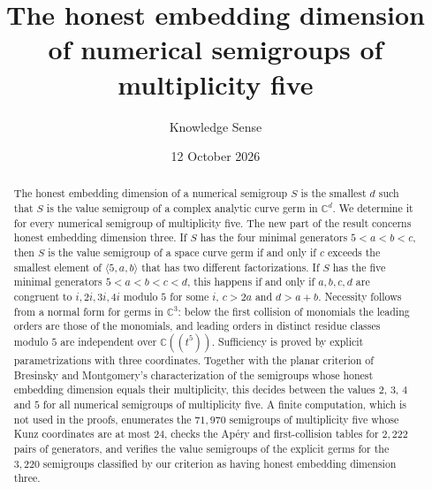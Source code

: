 \documentclass{amsart}
\theoremstyle{definition}
\theoremstyle{remark}
\numberwithin{equation}{section}
\newcommand{\C}{\mathbb{C}}
\newcommand{\gen}[1]{\langle #1\rangle}
\begin{document}
\title[Honest embedding dimension in multiplicity five]{The honest embedding dimension of numerical semigroups of multiplicity five}

\author{Knowledge Sense}

\date{12 October 2026}



\begin{abstract}
The honest embedding dimension of a numerical semigroup $S$ is the smallest $d$ such that $S$ is the value semigroup of a complex analytic curve germ in $\C^d$. We determine it for every numerical semigroup of multiplicity five. The new part of the result concerns honest embedding dimension three. If $S$ has the four minimal generators $5<a<b<c$, then $S$ is the value semigroup of a space curve germ if and only if $c$ exceeds the smallest element of $\gen{5,a,b}$ that has two different factorizations. If $S$ has the five minimal generators $5<a<b<c<d$, this happens if and only if $a,b,c,d$ are congruent to $i,2i,3i,4i$ modulo $5$ for some $i$, $c>2a$ and $d>a+b$. Necessity follows from a normal form for germs in $\C^3$: below the first collision of monomials the leading orders are those of the monomials, and leading orders in distinct residue classes modulo $5$ are independent over $\C((t^5))$. Sufficiency is proved by explicit parametrizations with three coordinates. Together with the planar criterion of Bresinsky and Montgomery's characterization of the semigroups whose honest embedding dimension equals their multiplicity, this decides between the values $2$, $3$, $4$ and $5$ for all numerical semigroups of multiplicity five. A finite computation, which is not used in the proofs, enumerates the $71{,}970$ semigroups of multiplicity five whose Kunz coordinates are at most $24$, checks the Ap\'ery and first-collision tables for $2{,}222$ pairs of generators, and verifies the value semigroups of the explicit germs for the $3{,}220$ semigroups classified by our criterion as having honest embedding dimension three.
\end{abstract}

\maketitle
\end{document}
